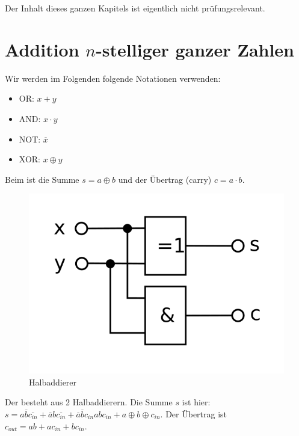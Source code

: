 \begin{*anmerkung}
	Der Inhalt dieses ganzen Kapitels ist eigentlich nicht prüfungsrelevant.
\end{*anmerkung}

\section{Addition $n$-stelliger ganzer Zahlen}

Wir werden im Folgenden folgende Notationen verwenden:
\begin{itemize}
	\item OR: $x+y$
	\item AND: $x\cdot y$
	\item NOT: $\overline{x}$
	\item XOR: $x\oplus y$
\end{itemize}

Beim  ist die Summe $s=a\oplus b$ und der Übertrag (carry) $c=a\cdot b$.

\begin{figure}[ht]
	\centering
	\includegraphics{images/Halbaddierer.png}
	\caption{Halbaddierer}
\end{figure}

Der  besteht aus 2 Halbaddierern. Die Summe $s$ ist hier: $s=a\overline{b}\overline{c_{in}}+\overline{a}b\overline{c_{in}}+\overline{a}\overline{b}c_{in}abc_{in}+a\oplus b\oplus c_{in}$. Der Übertrag ist $c_{out}=ab+ac_{in}+bc_{in}$.

